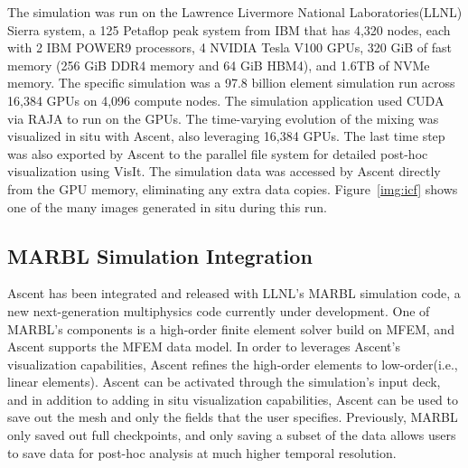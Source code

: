 The simulation was run on the Lawrence Livermore National Laboratories(LLNL)
Sierra system, a 125 Petaflop peak system from IBM that has 4,320 nodes,
each with 2 IBM POWER9 processors, 4 NVIDIA Tesla V100 GPUs, 320 GiB of
fast memory (256 GiB DDR4 memory and 64 GiB HBM4), and 1.6TB of NVMe
memory. The specific simulation was a 97.8 billion element simulation
run across 16,384 GPUs on 4,096 compute nodes. The simulation application
used CUDA via RAJA to run on the GPUs. The time-varying evolution of the
mixing was visualized in situ with Ascent, also leveraging 16,384 GPUs.
The last time step was also exported by Ascent to the parallel file
system for detailed post-hoc visualization using VisIt. The simulation
data was accessed by Ascent directly from the GPU memory, eliminating any
extra data copies.
Figure~\ref{img:icf} shows one of the many images generated in situ during
this run.

\subsection{MARBL Simulation Integration}
Ascent has been integrated and released with LLNL's MARBL simulation code,
a new next-generation multiphysics code currently under development.
%
One of MARBL's components is a high-order finite element solver build on
MFEM, and Ascent supports the MFEM data model.
%
In order to leverages Ascent's visualization capabilities, Ascent refines
the high-order elements to low-order(i.e., linear elements).
%
Ascent can be activated through the simulation's input deck, and in addition
to adding in situ visualization capabilities, Ascent can be used to save out
the mesh and only the fields that the user specifies.
%
Previously, MARBL only saved out full checkpoints, and only saving a subset of the
data allows users to save data for post-hoc analysis at much higher temporal resolution.

